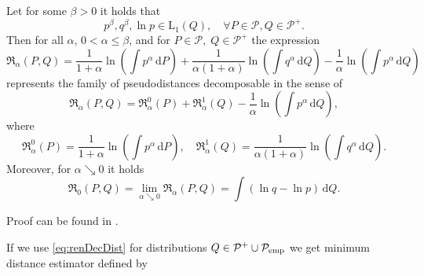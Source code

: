 \begin{theorem}
Let for some $\beta>0$ it holds that
	\begin{equation*}
			p^\beta, q^\beta,\ln{p} \in \mathrm{L}_1(Q), \quad \forall P \in \mathcal{P}, Q \in \mathcal{P^+}.
			\label{eq:betaCond}
	\end{equation*}
	Then for all $\alpha$, $0 < \alpha \leq \beta$, and for $P \in \mathcal{P}, \; Q \in \mathcal{P^+} $ the expression
	\begin{equation}
		\mathfrak{R}_\alpha (P,Q) = \dfrac{1}{1+\alpha}\ln{\left( \int{p^\alpha \,\mathrm{d}P } \right)} +
		\dfrac{1}{\alpha (1+\alpha)}\ln{\left( \int{q^\alpha \,\mathrm{d}Q } \right)} -
		\dfrac{1}{\alpha} \ln{\left( \int{p^\alpha \,\mathrm{d}Q } \right)}
		\label{eq:renDecDist}
	\end{equation}
		represents the family of pseudodistances decomposable in the sense of
	\begin{equation*}
		\mathfrak{R}_\alpha (P,Q) = \mathfrak{R}_\alpha^0 (P) + \mathfrak{R}_\alpha^1 (Q) - \dfrac{1}{\alpha} \ln{\left( \int{p^\alpha \,\mathrm{d}Q } \right)},
	\end{equation*}	
	where
	\begin{equation*}
		\mathfrak{R}_\alpha^0 (P) = \dfrac{1}{1+\alpha}\ln{\left( \int{p^\alpha \,\mathrm{d}P } \right)}, \quad \mathfrak{R}_\alpha^1 (Q) = \dfrac{1}{\alpha (1+\alpha)}\ln{\left( \int{q^\alpha \,\mathrm{d}Q } \right)}.
	\end{equation*}
	Moreover, for $\alpha \searrow 0$ it holds
	\begin{equation*}
		\mathfrak{R}_0 (P,Q) = \lim_{\alpha \searrow 0} \mathfrak{R}_\alpha (P,Q) =  \int{\left( \ln{q} - \ln{p} \right)\,\mathrm{d}Q}.
	\end{equation*}
\end{theorem}
Proof can be found in \cite{Decomposable2011}.

If we use \ref{eq:renDecDist} for distributions $Q \in \mathcal{P}^+ \cup \mathcal{P}_\mathrm{emp}$ we get minimum \ren distance estimator defined by

